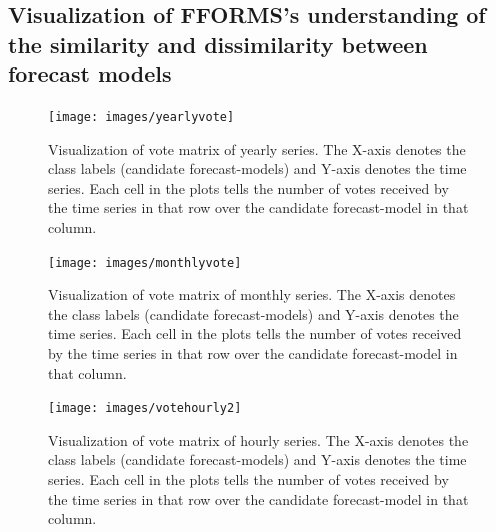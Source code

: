 \documentclass[11pt,a4paper,]{article}
\begin{document}
\hypertarget{oobviz}{%
\subsection{Visualization of FFORMS's understanding of the similarity and dissimilarity between forecast models}\label{oobviz}}

\begin{figure}[h]

{\centering \texttt{[image: images/yearlyvote]} 

}

\caption{Visualization of vote matrix of yearly series. The X-axis denotes the class labels (candidate forecast-models) and Y-axis denotes the time series. Each cell in the plots tells the number of votes received by the time series in that row over the candidate forecast-model in that column.}\label{fig:heatyearly}
\end{figure}

\begin{figure}[h]

{\centering \texttt{[image: images/monthlyvote]} 

}

\caption{Visualization of vote matrix of monthly series. The X-axis denotes the class labels (candidate forecast-models) and Y-axis denotes the time series. Each cell in the plots tells the number of votes received by the time series in that row over the candidate forecast-model in that column.}\label{fig:heatmonthly}
\end{figure}

\begin{figure}[h]

{\centering \texttt{[image: images/votehourly2]} 

}

\caption{Visualization of vote matrix of hourly series. The X-axis denotes the class labels (candidate forecast-models) and Y-axis denotes the time series. Each cell in the plots tells the number of votes received by the time series in that row over the candidate forecast-model in that column.}\label{fig:heathourly}
\end{figure}
\end{document}
